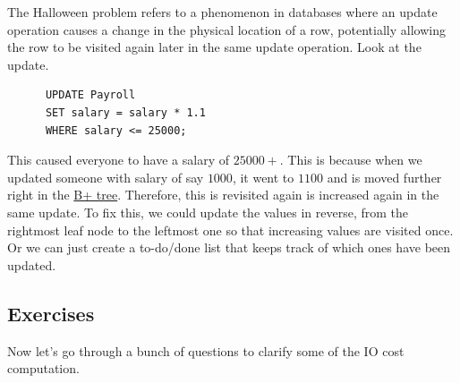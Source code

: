   \begin{example}
    \label{ex:halloween-problem}
    The Halloween problem refers to a phenomenon in databases where an update operation causes a change in the physical location of a row, potentially allowing the row to be visited again later in the same update operation. Look at the update. 
    \begin{lstlisting}
      UPDATE Payroll 
      SET salary = salary * 1.1 
      WHERE salary <= 25000;
    \end{lstlisting}
    This caused everyone to have a salary of $25000+$. This is because when we updated someone with salary of say $1000$, it went to $1100$ and is moved further right in the \hyperref[def:b-tree-2]{B+ tree}. Therefore, this is revisited again is increased again in the same update. To fix this, we could update the values in reverse, from the rightmost leaf node to the leftmost one so that increasing values are visited once. Or we can just create a to-do/done list that keeps track of which ones have been updated. 
  \end{example}

\subsection{Exercises}

  Now let's go through a bunch of questions to clarify some of the IO cost computation. 

